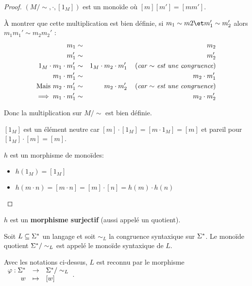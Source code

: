 \begin{proof}
	$(M/\sim, \cdot, [1_M])$ est un monoïde où $[m][m'] = [mm']$.

	À montrer que cette multiplication est bien définie, \cad si $m_1 \sim m2 \et m_1' \sim m_2'$ alors $m_1 m_1' \sim m_2 m_2'$ :
	\begin{eqnarray*}
		m_1 &\sim& m_2 \\
		m_1' &\sim& m_2' \\
		1_M \cdot  m_1 \cdot m_1' &\sim& 1_M \cdot m_2 \cdot m_1' \quad\left(\textit{car $\sim$ est une congruence}\right) \\
		m_1 \cdot m_1' &\sim&  m_2 \cdot m_1' \\
		\text{Mais } m_2 \cdot m_1' &\sim& m_2 \cdot m_2' \quad\left(\textit{car $\sim$ est une congruence}\right) \\
		\implies m_1 \cdot m_1' &\sim& m_2 \cdot m_2'
	\end{eqnarray*}

	Donc la multiplication sur $M/\sim$ est bien définie.


	$[1_M]$ est un élément neutre car $[m]\cdot [1_M] = [m \cdot 1_M] = [m]$ et pareil pour $[1_M]\cdot [m] = [m]$.

	$h$ est un morphisme de monoïdes:

	\begin{itemize}
		\item  $h(1_M) = [1_M]$
		\item  $h(m\cdot n) = [m \cdot n] = [m] \cdot [n] = h(m) \cdot h(n)$
	\end{itemize}
\end{proof}

\begin{remarque}
	$h$ est un \textbf{morphisme surjectif} (aussi appelé un quotient).
\end{remarque}

\begin{definition}
	Soit $L \subseteq \Sigma^{*}$ un langage et soit $\sim_L$ la congruence syntaxique sur $\Sigma^{*}$.
	Le monoïde quotient $\Sigma^{*} / \sim_L$ est appelé le monoïde syntaxique de $L$.
\end{definition}

\begin{prop}
	Avec les notations ci-dessus, $L$ est reconnu par le morphisme
	$ \begin{array}{rcl}
			\varphi : \Sigma^{*} & \to     & \Sigma^{*}/\sim_L \\
			w            & \mapsto & [w]
		\end{array} $.
\end{prop}


